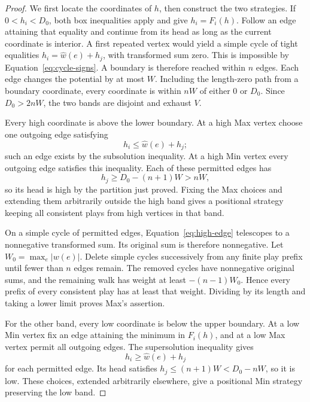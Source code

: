 \begin{proof}
We first locate the coordinates of $h$, then construct the two
strategies. If $0<h_i<D_0$, both box inequalities apply and give
$h_i=F_i(h)$. Follow an edge attaining that equality and continue
from its head as long as the current coordinate is interior. A first
repeated vertex would yield a simple cycle of tight equalities
$h_i=\widehat w(e)+h_j$, with transformed sum zero. This is
impossible by Equation~\eqref{eq:cycle-signs}. A boundary is
therefore reached within $n$ edges. Each edge changes the potential
by at most $W$. Including the length-zero path from a boundary
coordinate, every coordinate is within $nW$ of either $0$ or
$D_0$. Since $D_0>2nW$, the two bands are disjoint and exhaust $V$.

Every high coordinate is above the lower boundary. At a high Max
vertex choose one outgoing edge satisfying
\begin{equation}
                         h_i\le\widehat w(e)+h_j;
 \label{eq:high-edge}
\end{equation}
such an edge exists by the subsolution inequality. At a high Min
vertex every outgoing edge satisfies this inequality. Each of these
permitted edges has
\[
                  h_j\ge D_0-(n+1)W>nW,
\]
so its head is high by the partition just proved. Fixing the Max
choices and extending them arbitrarily outside the high band gives
a positional strategy keeping all consistent plays from high
vertices in that band.

On a simple cycle of permitted edges,
Equation~\eqref{eq:high-edge} telescopes to a nonnegative transformed
sum. Its original sum is therefore nonnegative. Let
$W_0=\max_e|w(e)|$. Delete simple cycles successively from any
finite play prefix until fewer than $n$ edges remain. The removed
cycles have nonnegative original sums, and the remaining walk has
weight at least $-(n-1)W_0$. Hence every prefix of every consistent
play has at least that weight. Dividing by its length and taking a
lower limit proves Max's assertion.

For the other band, every low coordinate is below the upper boundary.
At a low Min vertex fix an edge attaining the minimum in $F_i(h)$,
and at a low Max vertex permit all outgoing edges. The supersolution
inequality gives
\begin{equation}
                         h_i\ge\widehat w(e)+h_j
 \label{eq:low-edge}
\end{equation}
for each permitted edge. Its head satisfies
$h_j\le(n+1)W<D_0-nW$, so it is low. These choices, extended
arbitrarily elsewhere, give a positional Min strategy preserving
the low band.


\end{proof}
